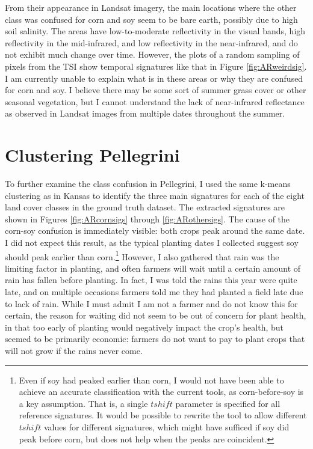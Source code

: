 From their appearance in Landsat imagery, the main locations where the other class was confused for corn and soy seem to be bare earth, possibly due to high soil salinity. The areas have low-to-moderate reflectivity in the visual bands, high reflectivity in the mid-infrared, and low reflectivity in the near-infrared, and do not exhibit much change over time. However, the plots of a random sampling of pixels from the TSI show temporal signatures like that in Figure \ref{fig:ARweirdsig}. I am currently unable to explain what is in these areas or why they are confused for corn and soy. I believe there may be some sort of summer grass cover or other seasonal vegetation, but I cannot understand the lack of near-infrared reflectance as observed in Landsat images from multiple dates throughout the summer.

\section{Clustering Pellegrini}

To further examine the class confusion in Pellegrini, I used the same k-means clustering as in Kansas to identify the three main signatures for each of the eight land cover classes in the ground truth dataset. The extracted signatures are shown in Figures \ref{fig:ARcornsigs} through \ref{fig:ARothersigs}. The cause of the corn-soy confusion is immediately visible: both crops peak around the same date. I did not expect this result, as the typical planting dates I collected suggest soy should peak earlier than corn.\footnote{Even if soy had peaked earlier than corn, I would not have been able to achieve an accurate classification with the current tools, as corn-before-soy is a key assumption. That is, a single $tshift$ parameter is specified for all reference signatures. It would be possible to rewrite the tool to allow different $tshift$ values for different signatures, which might have sufficed if soy did peak before corn, but does not help when the peaks are coincident.} However, I also gathered that rain was the limiting factor in planting, and often farmers will wait until a certain amount of rain has fallen before planting. In fact, I was told the rains this year were quite late, and on multiple occasions farmers told me they had planted a field late due to lack of rain. While I must admit I am not a farmer and do not know this for certain, the reason for waiting did not seem to be out of concern for plant health, in that too early of planting would negatively impact the crop's health, but seemed to be primarily economic: farmers do not want to pay to plant crops that will not grow if the rains never come.

